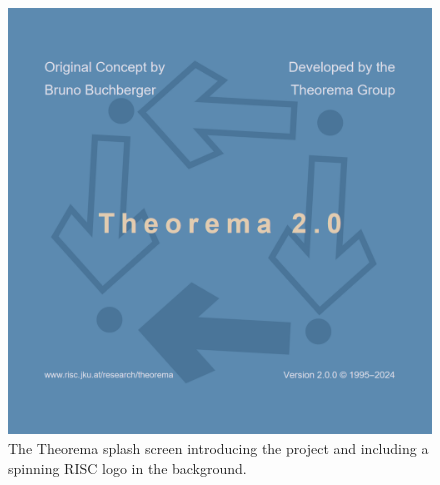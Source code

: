 \begin{figure}[h]
    \centering
    \includegraphics[scale=0.5]{images/theory/splash.png}
    \caption{The Theorema splash screen introducing the project and including a spinning RISC logo in the background.}
    \label{fig:splash}
\end{figure}

